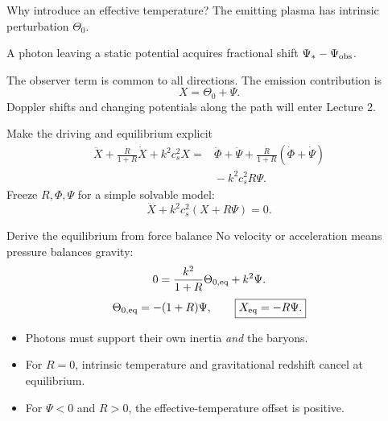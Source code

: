 \begin{frame}{Why introduce an effective temperature?}
The emitting plasma has intrinsic perturbation $\Theta_0$.
\medskip\par A photon leaving a static potential acquires fractional shift $\Psi_*-\Psi_{\rm obs}$.
\medskip\par The observer term is common to all directions. The emission contribution is
\[\boxed{X=\Theta_0+\Psi.}\]
Doppler shifts and changing potentials along the path will enter Lecture 2.
\end{frame}

\begin{frame}{Make the driving and equilibrium explicit}
\small
\[
\begin{aligned}
\ddot X+\frac{\dot R}{1+R}\dot X+k^2c_s^2X
={}&\ddot\Phi+\ddot\Psi+\frac{\dot R}{1+R}(\dot\Phi+\dot\Psi)\\
&{}-k^2c_s^2R\Psi.
\end{aligned}
\]
\normalsize Freeze $R,\Phi,\Psi$ for a simple solvable model:
\[\boxed{\ddot X+k^2c_s^2(X+R\Psi)=0.}\]
\end{frame}

\begin{frame}{Derive the equilibrium from force balance}
No velocity or acceleration means pressure balances gravity:
\[0=\frac{k^2}{1+R}\Theta_{0,\rm eq}+k^2\Psi.\]
\[\Theta_{0,\rm eq}=-(1+R)\Psi,\qquad
\boxed{X_{\rm eq}=-R\Psi.}\]
\begin{itemize}
\item Photons must support their own inertia \emph{and} the baryons.
\item For $R=0$, intrinsic temperature and gravitational redshift cancel at equilibrium.
\item For $\Psi<0$ and $R>0$, the effective-temperature offset is positive.
\end{itemize}
\end{frame}

